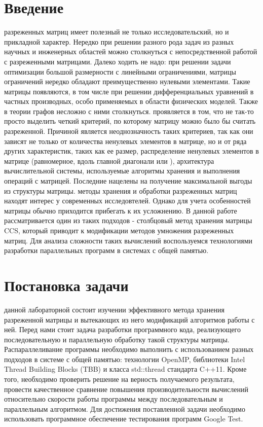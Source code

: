 \documentclass{report}
\begin{document}
\setcounter{page}{2}

\tableofcontents

\newpage

\section*{Введение}
 разреженных матриц имеет полезный не только исследовательский, но и прикладной характер. Нередко при решении разного рода задач из разных научных и инженерных областей можно столкнуться с непосредственной работой с разреженными матрицами. Далеко ходить не надо: при решении задачи оптимизации большой размерности с линейными ограничениями, матрицы ограничений нередко обладают преимущественно нулевыми элементами. Такие матрицы появляются, в том числе при решении дифференциальных уравнений в частных производных, особо применяемых в области физических моделей. Также в теории графов несложно с ними столкнуться.
 проявляется в том, что не так-то просто выделить четкий критерий, по которому матрицу можно было бы считать разреженной. Причиной является неоднозначность таких критериев, так как они зависят не только от количества ненулевых элементов в матрице, но и от ряда других характеристик, таких как ее размер, распределение ненулевых элементов в матрице (равномерное, вдоль главной диагонали или ), архитектура вычислительной системы, используемые алгоритмы хранения и выполнения операций с матрицей. Последние нацелены на получение максимальной выгоды из структуры матрицы.
 методы хранения и обработки разреженных матриц находят интерес у современных исследовтелей. Однако для учета особенностей матрицы обычно приходится прибегать к их усложнению. В данной работе рассматривается один из таких подходов - столбцовый метод хранения матрицы CCS, который приводит к модификации методов умножения разреженных матриц. Для анализа сложности таких вычислений воспользуемся технологиями разработки параллельных программ в системах с общей памятью.

\newpage

\section*{Постановка задачи}
 данной лабораторной состоит изучении эффективного метода хранения разреженной матрицы и вытекающих из него модификаций алгоритмов работы с ней. Перед нами стоит задача разработки программного кода, реализующего последовательную и параллельную обработку такой структуры матрицы. Распараллеливание программы необходимо выполнить с использованием разных подходов в системе с общей памятью: технологии OpenMP, библиотеки Intel Thread Building Blocks (TBB) и класса std::thread стандарта C++11. Кроме того, необходимо проверить решение на верность получаемого результата, провести качественное сравнение повышения производительности вычислений относительно скорости работы программы между последовательным и параллельным алгоритмом. Для достижения поставленной задачи необходимо использовать программное обеспечение тестирования программ Google Test.
\end{document}
